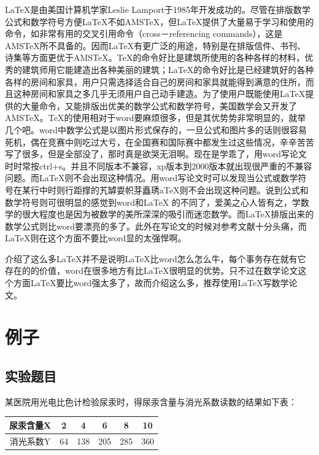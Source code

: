 \documentclass[UTF8,12pt,a4paper]{article}
\begin{document}
LaTeX是由美国计算机学家Leslie Lamport于1985年开发成功的。尽管在排版数学公式和数学符号方便LaTeX不如AMSTeX，但LaTeX提供了大量易于学习和使用的命令，如非常有用的交叉引用命令（cross－referencing commands），这是AMSTeX所不具备的。因而LaTeX有更广泛的用途，特别是在排版信件、书刊、诗集等方面更优于AMSTeX。TeX的命令好比是建筑所使用的各种各样的材料，优秀的建筑师用它能建造出各种美丽的建筑；LaTeX的命令好比是已经建筑好的各种各样的房间和家具，用户只需选择适合自己的房间和家具就能得到满意的住所，而且这种房间和家具之多几乎无须用户自己动手建造。为了使用户既能使用LaTeX提供的大量命令，又能排版出优美的数学公式和数学符号，美国数学会又开发了AMSTeX。TeX的使用相对于word要麻烦很多，但是其优势势非常明显的，就举几个吧。word中数学公式是以图片形式保存的，一旦公式和图片多的话则很容易死机，偶在竞赛中则吃过大亏，在全国赛和国际赛中都发生过这些情况，辛辛苦苦写了很多，但是全部没了，那时真是欲哭无泪啊。现在是学乖了，用word写论文时时常按ctrl+s。并且不同版本不兼容，xp版本到2000版本就出现很严重的不兼容问题。而LaTeX则不会出现这种情况。用word写论文时可以发现当公式或数学符号在某行中时则行距撑的艽罅耍帜芽矗琇aTeX则不会出现这种问题。说到公式和数学符号则可很明显的感觉到word和LaTeX 的不同了，爱美之心人皆有之，学数学的很大程度也是因为被数学的美所深深的吸引而迷恋数学。而LaTeX排版出来的数学公式则比word要漂亮的多了。此外在写论文的时候对参考文献十分头痛，而LaTeX则在这个方面不要比word显的太强悍啊。

介绍了这么多LaTeX并不是说明LaTeX比word怎么怎么牛，每个事务存在就有它存在的的价值，word在很多地方有比LaTeX很明显的优势。只不过在数学论文这个方面LaTeX要比word强太多了，故而介绍这么多，推荐使用LaTeX写数学论文。


\section{例子}
\subsection{实验题目}
某医院用光电比色计检验尿汞时，得尿汞含量与消光系数读数的结果如下表：
\begin{table}[!h]
	\centering
	\begin{tabular}{cccccc}
		\toprule
		尿汞含量X & 2     & 4     & 6     & 8     & 10 \\
		\midrule
		消光系数Y & 64    & 138   & 205   & 285   & 360 \\
		\bottomrule
	\end{tabular}%
	\label{tab:exercise8_3}%
\end{table}%
\end{document}
